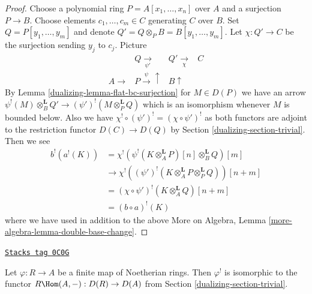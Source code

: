 \begin{proof}

Choose a polynomial ring $P = A[x_1, \ldots, x_n]$ over $A$
and a surjection $P \to B$. Choose elements $c_1, \ldots, c_m \in C$
generating $C$ over $B$. Set $Q = P[y_1, \ldots, y_m]$ and
denote $Q' = Q \otimes_P B = B[y_1, \ldots, y_m]$.
Let $\chi : Q' \to C$ be the surjection sending $y_j$ to $c_j$.
Picture
$$
\begin{array}{cccc} & Q \underset{\psi'}{\longrightarrow} & Q' \underset{\chi}{\longrightarrow} & C \\ A \longrightarrow & P \overset{\psi}{\longrightarrow}\uparrow & B \uparrow & \end{array}
$$
By Lemma \ref{dualizing-lemma-flat-bc-surjection} for $M \in D(P)$ we have an arrow
$\psi^!(M) \otimes_B^\mathbf{L} Q' \to (\psi')^!(M \otimes_P^\mathbf{L} Q)$
which is an isomorphism whenever $M$ is bounded below. Also
we have $\chi^! \circ (\psi')^! = (\chi \circ \psi')^!$ as both
functors are adjoint to the restriction functor $D(C) \to D(Q)$
by Section \ref{dualizing-section-trivial}. Then we see
\begin{align*}
b^!(a^!(K))
& =
\chi^!(\psi^!(K \otimes_A^\mathbf{L} P)[n] \otimes_B^\mathbf{L} Q)[m] \\
& \to
\chi^!((\psi')^!(K \otimes_A^\mathbf{L} P \otimes_P^\mathbf{L} Q))[n + m] \\
& =
(\chi \circ \psi')^!(K\otimes_A^\mathbf{L} Q)[n + m] \\
& =
(b \circ a)^!(K)
\end{align*}
where we have used in addition to the above
More on Algebra, Lemma \ref{more-algebra-lemma-double-base-change}.
\end{proof}

\begin{lemma}
\label{dualizing-lemma-upper-shriek-finite}
\href{https://stacks.math.columbia.edu/tag/0C0G}{\texttt{Stacks tag 0C0G}}

Let $\varphi : R \to A$ be a finite map of Noetherian rings.
Then $\varphi^!$ is isomorphic to the functor
$R\Hom(A, -) : D(R) \to D(A)$ from
Section \ref{dualizing-section-trivial}.
\end{lemma}

